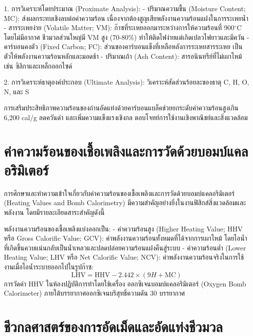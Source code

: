 1. การวิเคราะห์โดยประมาณ (Proximate Analysis):
- ปริมาณความชื้น (Moisture Content; MC): ส่งผลกระทบเชิงลบต่อค่าความร้อน เนื่องจากต้องสูญเสียพลังงานความร้อนแฝงในการระเหยน้ำ
- สารระเหยง่าย (Volatile Matter; VM): ก๊าซที่ระเหยออกมาระหว่างการให้ความร้อนที่ 900$^{\circ}$C โดยไม่มีอากาศ ชีวมวลส่วนใหญ่มี VM สูง (70-80\%) ทำให้ติดไฟง่ายแต่เกิดเปลวไฟยาวและมีควัน
- คาร์บอนคงตัว (Fixed Carbon; FC): ส่วนของคาร์บอนแข็งที่เหลือหลังการระเหยสารระเหย เป็นตัวให้พลังงานความร้อนหลักและมอดช้า
- ปริมาณเถ้า (Ash Content): สารอนินทรีย์ที่ไม่เผาไหม้ เช่น ซิลิกาและเหล็กออกไซด์

2. การวิเคราะห์ธาตุองค์ประกอบ (Ultimate Analysis): วิเคราะห์สัดส่วนร้อยละของธาตุ C, H, O, N, และ S

\begin{flamebox}
การเสริมประสิทธิภาพความร้อนของถ่านอัดแท่งด้วยคาร์บอนแบล็คช่วยยกระดับค่าความร้อนสูงเกิน 6,200 cal/g ลดควันดำ และเพิ่มความแข็งแรงเชิงกล ตอบโจทย์การใช้งานเชิงพาณิชย์และสิ่งแวดล้อม
\end{flamebox}

\section{ค่าความร้อนของเชื้อเพลิงและการวัดด้วยบอมบ์แคลอริมิเตอร์}

การศึกษาและทำความเข้าใจเกี่ยวกับค่าความร้อนของเชื้อเพลิงและการวัดด้วยบอมบ์แคลอริมิเตอร์ (Heating Values and Bomb Calorimetry) มีความสำคัญอย่างยิ่งในงานฟิสิกส์สิ่งแวดล้อมและพลังงาน โดยมีรายละเอียดสาระสำคัญดังนี้

พลังงานความร้อนของเชื้อเพลิงแบ่งออกเป็น:
- ค่าความร้อนสูง (Higher Heating Value; HHV หรือ Gross Calorific Value; GCV): ค่าพลังงานความร้อนทั้งหมดที่ได้จากการเผาไหม้ โดยไอน้ำที่เกิดขึ้นควบแน่นกลับเป็นน้ำเหลวและปลดปล่อยความร้อนแฝงคืนสู่ระบบ
- ค่าความร้อนต่ำ (Lower Heating Value; LHV หรือ Net Calorific Value; NCV): ค่าพลังงานความร้อนจริงในการใช้งานเมื่อไอน้ำระบายออกไปในรูปก๊าซ:
\[ \text{LHV} = \text{HHV} - 2.442 \times (9H + \text{MC}) \]
การวัดค่า HHV ในห้องปฏิบัติการทำโดยใช้เครื่อง ออกซิเจนบอมบ์แคลอริมิเตอร์ (Oxygen Bomb Calorimeter) ภายใต้บรรยากาศออกซิเจนบริสุทธิ์ความดัน 30 บรรยากาศ

\section{ชีวกลศาสตร์ของการอัดเม็ดและอัดแท่งชีวมวล}

